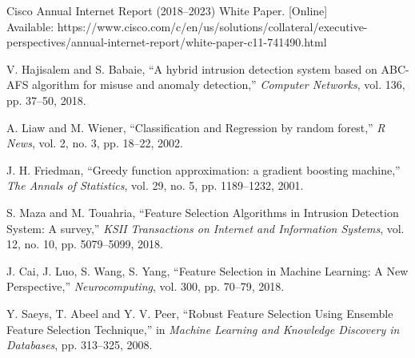 \documentclass{ieeeaccess}
\theoremstyle{definition}
\begin{document}
\begin{thebibliography}{00}
    Cisco Annual Internet Report (2018–2023) White Paper. [Online] \\ Available: https://www.cisco.com/c/en/us/solutions/collateral/executive- \\ perspectives/annual-internet-report/white-paper-c11-741490.html
    
    V. Hajisalem and S. Babaie, ``A hybrid intrusion detection system based on ABC-AFS algorithm for misuse and anomaly detection,'' \emph{Computer Networks}, vol. 136, pp. 37--50, 2018.

    A. Liaw and M. Wiener, ``Classification and Regression by random forest,'' \emph{R News}, vol. 2, no. 3, pp. 18--22, 2002.

    J. H. Friedman, ``Greedy function approximation: a gradient boosting machine,'' \emph{The Annals of Statistics}, vol. 29, no. 5, pp. 1189--1232, 2001. 

    S. Maza and M. Touahria, ``Feature Selection Algorithms in Intrusion Detection System: A survey,'' \emph{KSII Transactions on Internet and Information Systems}, vol. 12, no. 10, pp. 5079--5099, 2018.

    J. Cai, J. Luo, S. Wang, S. Yang, ``Feature Selection in Machine Learning: A New Perspective,'' \emph{Neurocomputing}, vol. 300, pp. 70--79, 2018.




    Y. Saeys, T. Abeel and Y. V. Peer, ``Robust Feature Selection Using Ensemble Feature Selection Technique,'' in \emph{Machine Learning and Knowledge Discovery in Databases}, pp. 313--325, 2008.


\end{thebibliography}
\end{document}
